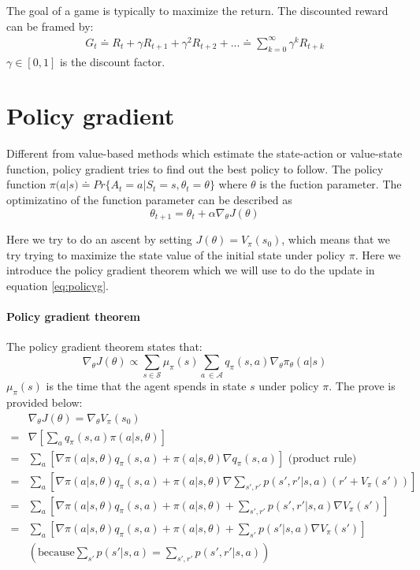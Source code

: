 \documentclass{article}
\begin{document}
\begin{multicols*}{2}
		The goal of a game is typically to maximize the return. The discounted reward can be framed by:
		\begin{align*}
			 G_t \doteq R_{t} + \gamma R_{t+1} + \gamma^{2}R_{t+2} + ... \doteq  \sum_{k=0}^{\infty} \gamma^{k}R_{t+k} 
		\end{align*}
		$ \gamma \in [0, 1] $ is the discount factor.
		
		\section*{Policy gradient}
		 Different from value-based methods which estimate the state-action or value-state function, policy gradient tries to find out the best policy to follow. The policy function $ \pi(a | s) \doteq Pr\{A_t = a | S_t = s, \theta_t = \theta \} $ where $ \theta$ is the fuction parameter. The optimizatino of the function parameter can be described as 
		\begin{equation}\label{eq:policyg}
		\theta_{t+1} = \theta_t + \alpha \nabla_\theta J(\theta) 
		\end{equation}
		
		Here we try to do an ascent by setting $ J(\theta) = V_\pi(s_0) $, which means that we try trying to maximize the state value of the initial state under policy $ \pi $. Here we introduce the policy gradient theorem which we will use to do the update in equation \ref{eq:policyg}.
		\paragraph{\ding{56} Policy gradient theorem}
		The policy gradient theorem states that:
		$$ \nabla_\theta J(\theta) \propto \sum_{s \in \mathcal{S}} \mu_\pi (s) \sum_{a \ \in \mathcal{A}} q_\pi (s,a) \nabla_\theta \pi_\theta(a | s) $$
		$ \mu_\pi (s) $ is the time that the agent spends in state $ s $ under policy $ \pi$. The prove is provided below:
		\begin{align*}
		{}& \nabla_\theta J(\theta)  = \nabla_\theta V_\pi (s_0)   \\
		={}& \nabla [ \sum_a q_\pi(s, a) \pi(a | s, \theta) ] \\
		={}& \sum_ a [ \nabla \pi(a | s, \theta) q_\pi(s, a) +  \pi(a | s, \theta)  \nabla  q_\pi(s, a)] \text{ (product rule)} \\
		={}& \sum_ a [ \nabla \pi(a | s, \theta) q_\pi(s, a) + \pi(a | s, \theta) 
		\nabla  \sum_{s', r'} p(s', r' | s, a) (r' + V_\pi(s')) ]  \\
		={}& \sum_ a [ \nabla \pi(a | s, \theta) q_\pi(s, a) + \pi(a | s, \theta)  
		+  \sum_{s', r'} p(s', r' | s, a)  \nabla  V_\pi(s') ] \\
		={}& \sum_ a [ \nabla \pi(a | s, \theta) q_\pi(s, a) + \pi(a | s, \theta)  
		 +  \sum_{s'} p(s' | s, a) \nabla  V_\pi(s') ] \\
		{}&( \text{because} \sum_{s'} p(s' | s, a) = \sum_{s', r'} p(s', r' | s, a) ) 
		\end{align*} 
		

\end{multicols*}
\end{document}
